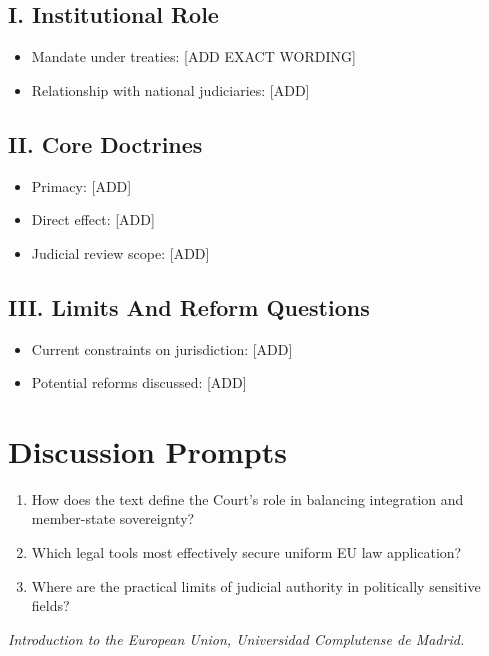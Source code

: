 \documentclass[11pt,a4paper]{article}
\begin{document}
\subsection*{I. Institutional Role}
\begin{itemize}
\item Mandate under treaties: [ADD EXACT WORDING]
\item Relationship with national judiciaries: [ADD]
\end{itemize}

\subsection*{II. Core Doctrines}
\begin{itemize}
\item Primacy: [ADD]
\item Direct effect: [ADD]
\item Judicial review scope: [ADD]
\end{itemize}

\subsection*{III. Limits And Reform Questions}
\begin{itemize}
\item Current constraints on jurisdiction: [ADD]
\item Potential reforms discussed: [ADD]
\end{itemize}

\section*{Discussion Prompts}
\begin{enumerate}
\item How does the text define the Court's role in balancing integration and member-state sovereignty?
\item Which legal tools most effectively secure uniform EU law application?
\item Where are the practical limits of judicial authority in politically sensitive fields?
\end{enumerate}

\vspace{1em}
\noindent\footnotesize\textit{Introduction to the European Union, Universidad Complutense de Madrid.}
\end{document}

